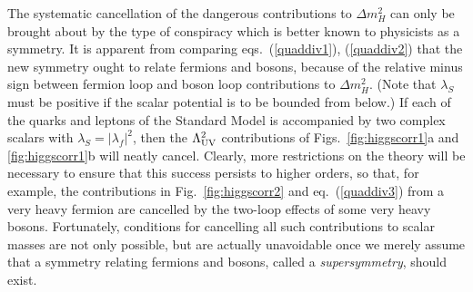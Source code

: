 The systematic cancellation of the dangerous
contributions to $\Delta m_H^2$ can
only be brought about by the type of conspiracy which is better known
to physicists as a symmetry. It is apparent from comparing
eqs.~(\ref{quaddiv1}), (\ref{quaddiv2})
that the new symmetry ought to relate fermions and bosons, because
of the relative minus sign between fermion loop and boson loop
contributions to $\Delta m_H^2$. (Note that $\lambda_S$ must be positive
if the scalar potential is to be bounded from below.) If
each of the quarks and leptons of the Standard Model is accompanied
by two complex scalars with $\lambda_S = |\lambda_f|^2$,
then the $\Lambda_{\rm UV}^2$ contributions
of Figs.~\ref{fig:higgscorr1}a and \ref{fig:higgscorr1}b will neatly
cancel.\cite{quadscancel}
Clearly, more restrictions on the theory will be necessary
to ensure that this success persists to higher orders, so that,
for example, the contributions in Fig.~\ref{fig:higgscorr2}  and
eq.~(\ref{quaddiv3}) from a
very heavy
fermion are cancelled by the two-loop effects of some very heavy bosons.
Fortunately, conditions for cancelling all such
contributions to scalar masses are not only possible,
but are actually unavoidable once we merely assume that a symmetry relating
fermions and bosons, called a {\it supersymmetry}, should exist.

